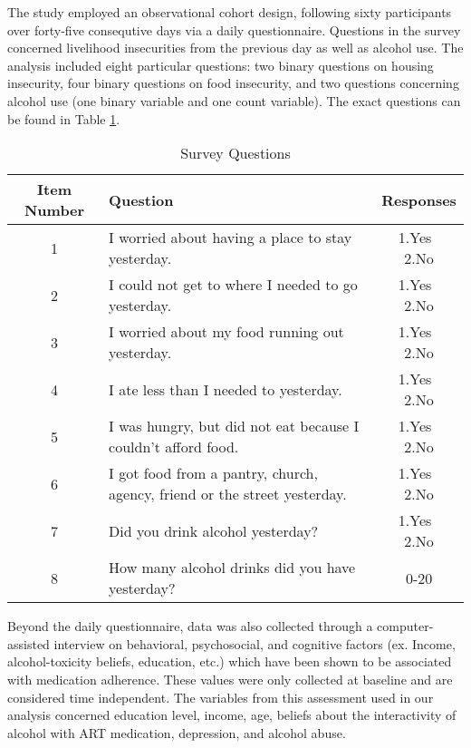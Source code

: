 \documentclass{svjour3}                     %
\begin{document}
The study employed an observational cohort design, following sixty participants over forty-five consequtive days via a daily questionnaire. Questions in the survey concerned livelihood insecurities from the previous day as well as alcohol use. The analysis included eight particular questions: two binary questions on housing insecurity, four binary questions on food insecurity, and two questions concerning alcohol use (one binary variable and one count variable). The exact questions can be found in Table \ref{tab:table1}. \par

\begin{table}[t]
	\centering
	\caption{Survey Questions}
	\label{tab:table1}
	\begin{tabular}{cp{6.5cm}c}
		\toprule
		Item Number & Question & Responses\\
		\midrule
		1 & I worried about having a place to stay yesterday. & 1.Yes $\>$ 2.No \\
		2 & I could not get to where I needed to go yesterday. & 1.Yes $\>$ 2.No \\
		3 & I worried about my food running out yesterday. & 1.Yes $\>$ 2.No \\
		4 & I ate less than I needed to yesterday. & 1.Yes $\>$ 2.No \\
		5 & I was hungry, but did not eat because I couldn't afford food. & 1.Yes $\>$ 2.No \\
		6 & I got food from a pantry, church, agency, friend or the street yesterday. & 1.Yes $\>$ 2.No \\
		7 & Did you drink alcohol yesterday? & 1.Yes $\>$ 2.No \\
		8 & How many alcohol drinks did you have yesterday? & 0-20 \\
		\bottomrule
	\end{tabular}
\end{table}

Beyond the daily questionnaire, data was also collected through a computer-assisted interview on behavioral, psychosocial, and cognitive factors (ex. Income, alcohol-toxicity beliefs, education, etc.) which have been shown to be associated with medication adherence. These values were only collected at baseline and are considered time independent. The variables from this assessment used in our analysis concerned education level, income, age, beliefs about the interactivity of alcohol with ART medication, depression, and alcohol abuse. \par
\end{document}
